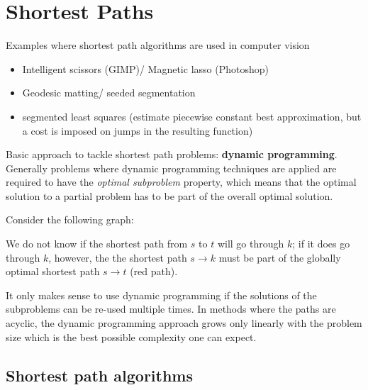 \chapter{Shortest Paths}%
\label{chap:06}

Examples where shortest path algorithms are used in computer vision
\begin{itemize}
\item Intelligent scissors (GIMP)/ Magnetic lasso (Photoshop)
\item Geodesic matting/ seeded segmentation
\item segmented least squares (estimate piecewise constant best
  approximation, but a cost is imposed on jumps in the resulting
  function)
\end{itemize}

Basic approach to tackle shortest path problems: \textbf{dynamic
  programming}. Generally problems where dynamic programming
techniques are applied are required to have the \emph{optimal
  subproblem} property, which means that the optimal solution to a
partial problem has to be part of the overall optimal solution.
\begin{example*}
  Consider the following graph:
  \begin{figure}[h!]
    \centering
  \end{figure}
  
  We do not know if the shortest path from $s$ to $t$ will go through
  $k$; if it does go through $k$, however, the the shortest path
  $s \rightarrow k$ must be part of the globally optimal shortest path
  $s \rightarrow t$ (red path).
\end{example*}
It only makes sense to use dynamic programming if the solutions of the
subproblems can be re-used multiple times. In methods where the paths
are acyclic, the dynamic programming approach grows only linearly with
the problem size which is the best possible complexity one can expect.

\setcounter{section}{1}
\section{Shortest path algorithms}%
\label{sec:shortpathalgo}


